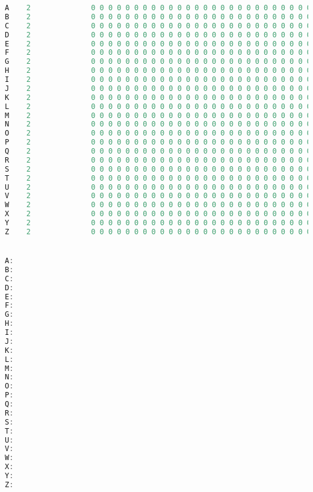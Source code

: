 \documentclass[a4paper,10pt,ngerman]{scrartcl}
\begin{document}
\begin{lstlisting}[language=C++]
A    2              0 0 0 0 0 0 0 0 0 0 0 0 0 0 0 0 0 0 0 0 0 0 0 0 0 0
B    2              0 0 0 0 0 0 0 0 0 0 0 0 0 0 0 0 0 0 0 0 0 0 0 0 0 0
C    2              0 0 0 0 0 0 0 0 0 0 0 0 0 0 0 0 0 0 0 0 0 0 0 0 0 0
D    2              0 0 0 0 0 0 0 0 0 0 0 0 0 0 0 0 0 0 0 0 0 0 0 0 0 0
E    2              0 0 0 0 0 0 0 0 0 0 0 0 0 0 0 0 0 0 0 0 0 0 0 0 0 0
F    2              0 0 0 0 0 0 0 0 0 0 0 0 0 0 0 0 0 0 0 0 0 0 0 0 0 0
G    2              0 0 0 0 0 0 0 0 0 0 0 0 0 0 0 0 0 0 0 0 0 0 0 0 0 0
H    2              0 0 0 0 0 0 0 0 0 0 0 0 0 0 0 0 0 0 0 0 0 0 0 0 0 0
I    2              0 0 0 0 0 0 0 0 0 0 0 0 0 0 0 0 0 0 0 0 0 0 0 0 0 0
J    2              0 0 0 0 0 0 0 0 0 0 0 0 0 0 0 0 0 0 0 0 0 0 0 0 0 0
K    2              0 0 0 0 0 0 0 0 0 0 0 0 0 0 0 0 0 0 0 0 0 0 0 0 0 0
L    2              0 0 0 0 0 0 0 0 0 0 0 0 0 0 0 0 0 0 0 0 0 0 0 0 0 0
M    2              0 0 0 0 0 0 0 0 0 0 0 0 0 0 0 0 0 0 0 0 0 0 0 0 0 0
N    2              0 0 0 0 0 0 0 0 0 0 0 0 0 0 0 0 0 0 0 0 0 0 0 0 0 0
O    2              0 0 0 0 0 0 0 0 0 0 0 0 0 0 0 0 0 0 0 0 0 0 0 0 0 0
P    2              0 0 0 0 0 0 0 0 0 0 0 0 0 0 0 0 0 0 0 0 0 0 0 0 0 0
Q    2              0 0 0 0 0 0 0 0 0 0 0 0 0 0 0 0 0 0 0 0 0 0 0 0 0 0
R    2              0 0 0 0 0 0 0 0 0 0 0 0 0 0 0 0 0 0 0 0 0 0 0 0 0 0
S    2              0 0 0 0 0 0 0 0 0 0 0 0 0 0 0 0 0 0 0 0 0 0 0 0 0 0
T    2              0 0 0 0 0 0 0 0 0 0 0 0 0 0 0 0 0 0 0 0 0 0 0 0 0 0
U    2              0 0 0 0 0 0 0 0 0 0 0 0 0 0 0 0 0 0 0 0 0 0 0 0 0 0
V    2              0 0 0 0 0 0 0 0 0 0 0 0 0 0 0 0 0 0 0 0 0 0 0 0 0 0
W    2              0 0 0 0 0 0 0 0 0 0 0 0 0 0 0 0 0 0 0 0 0 0 0 0 0 0
X    2              0 0 0 0 0 0 0 0 0 0 0 0 0 0 0 0 0 0 0 0 0 0 0 0 0 0
Y    2              0 0 0 0 0 0 0 0 0 0 0 0 0 0 0 0 0 0 0 0 0 0 0 0 0 0
Z    2              0 0 0 0 0 0 0 0 0 0 0 0 0 0 0 0 0 0 0 0 0 0 0 0 0 0


A:
B:
C:
D:
E:
F:
G:
H:
I:
J:
K:
L:
M:
N:
O:
P:
Q:
R:
S:
T:
U:
V:
W:
X:
Y:
Z:
\end{lstlisting}
\end{document}
